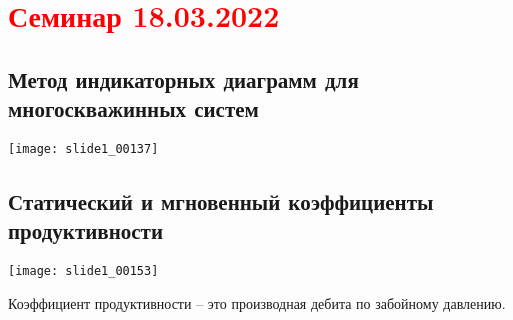 \documentclass[main.tex]{subfiles}
\begin{document}
\section{\textcolor{red}{Семинар 18.03.2022}}

\subsection{Метод индикаторных диаграмм для многоскважинных систем}

\texttt{[image: slide1\_00137]}















\subsection{Статический и мгновенный коэффициенты продуктивности}

\texttt{[image: slide1\_00153]}

Коэффициент продуктивности -- это производная дебита по забойному давлению.







\end{document}
